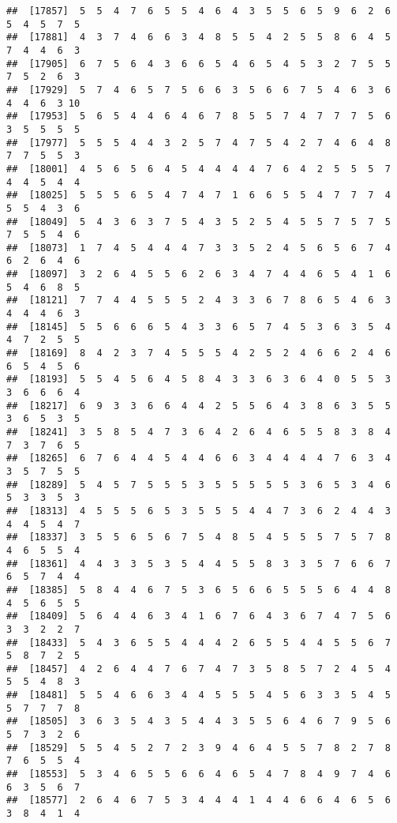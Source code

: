 \documentclass[
]{book}
\begin{document}
\begin{verbatim}
##  [17857]  5  5  4  7  6  5  5  4  6  4  3  5  5  6  5  9  6  2  6  5  4  5  7  5
##  [17881]  4  3  7  4  6  6  3  4  8  5  5  4  2  5  5  8  6  4  5  7  4  4  6  3
##  [17905]  6  7  5  6  4  3  6  6  5  4  6  5  4  5  3  2  7  5  5  7  5  2  6  3
##  [17929]  5  7  4  6  5  7  5  6  6  3  5  6  6  7  5  4  6  3  6  4  4  6  3 10
##  [17953]  5  6  5  4  4  6  4  6  7  8  5  5  7  4  7  7  7  5  6  3  5  5  5  5
##  [17977]  5  5  5  4  4  3  2  5  7  4  7  5  4  2  7  4  6  4  8  7  7  5  5  3
##  [18001]  4  5  6  5  6  4  5  4  4  4  4  7  6  4  2  5  5  5  7  4  4  5  4  4
##  [18025]  5  5  5  6  5  4  7  4  7  1  6  6  5  5  4  7  7  7  4  5  5  4  3  6
##  [18049]  5  4  3  6  3  7  5  4  3  5  2  5  4  5  5  7  5  7  5  7  5  5  4  6
##  [18073]  1  7  4  5  4  4  4  7  3  3  5  2  4  5  6  5  6  7  4  6  2  6  4  6
##  [18097]  3  2  6  4  5  5  6  2  6  3  4  7  4  4  6  5  4  1  6  5  4  6  8  5
##  [18121]  7  7  4  4  5  5  5  2  4  3  3  6  7  8  6  5  4  6  3  4  4  4  6  3
##  [18145]  5  5  6  6  6  5  4  3  3  6  5  7  4  5  3  6  3  5  4  4  7  2  5  5
##  [18169]  8  4  2  3  7  4  5  5  5  4  2  5  2  4  6  6  2  4  6  6  5  4  5  6
##  [18193]  5  5  4  5  6  4  5  8  4  3  3  6  3  6  4  0  5  5  3  3  6  6  6  4
##  [18217]  6  9  3  3  6  6  4  4  2  5  5  6  4  3  8  6  3  5  5  3  6  5  3  5
##  [18241]  3  5  8  5  4  7  3  6  4  2  6  4  6  5  5  8  3  8  4  7  3  7  6  5
##  [18265]  6  7  6  4  4  5  4  4  6  6  3  4  4  4  4  7  6  3  4  3  5  7  5  5
##  [18289]  5  4  5  7  5  5  5  3  5  5  5  5  5  3  6  5  3  4  6  5  3  3  5  3
##  [18313]  4  5  5  5  6  5  3  5  5  5  4  4  7  3  6  2  4  4  3  4  4  5  4  7
##  [18337]  3  5  5  6  5  6  7  5  4  8  5  4  5  5  5  7  5  7  8  4  6  5  5  4
##  [18361]  4  4  3  3  5  3  5  4  4  5  5  8  3  3  5  7  6  6  7  6  5  7  4  4
##  [18385]  5  8  4  4  6  7  5  3  6  5  6  6  5  5  5  6  4  4  8  4  5  6  5  5
##  [18409]  5  6  4  4  6  3  4  1  6  7  6  4  3  6  7  4  7  5  6  3  3  2  2  7
##  [18433]  5  4  3  6  5  5  4  4  4  2  6  5  5  4  4  5  5  6  7  5  8  7  2  5
##  [18457]  4  2  6  4  4  7  6  7  4  7  3  5  8  5  7  2  4  5  4  5  5  4  8  3
##  [18481]  5  5  4  6  6  3  4  4  5  5  5  4  5  6  3  3  5  4  5  5  7  7  7  8
##  [18505]  3  6  3  5  4  3  5  4  4  3  5  5  6  4  6  7  9  5  6  5  7  3  2  6
##  [18529]  5  5  4  5  2  7  2  3  9  4  6  4  5  5  7  8  2  7  8  7  6  5  5  4
##  [18553]  5  3  4  6  5  5  6  6  4  6  5  4  7  8  4  9  7  4  6  6  3  5  6  7
##  [18577]  2  6  4  6  7  5  3  4  4  4  1  4  4  6  6  4  6  5  6  3  8  4  1  4

\end{verbatim}
\end{document}
